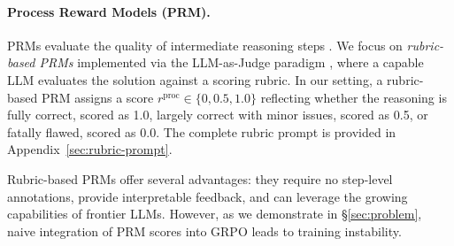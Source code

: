 \paragraph{Process Reward Models (PRM).}
PRMs evaluate the quality of intermediate reasoning steps \citep{zheng2023judgingllmasajudgemtbenchchatbot,lightman2023lets, wang2024math}. We focus on \emph{rubric-based PRMs} implemented via the LLM-as-Judge paradigm \citep{yuan2025miraclesteps,Sheng2026ReinforcingCR,Yang2026}, where a capable LLM evaluates the solution against a scoring rubric. In our setting, a rubric-based PRM assigns a score $r^{\text{proc}} \in \{0, 0.5, 1.0\}$ reflecting whether the reasoning is fully correct, scored as 1.0, largely correct with minor issues, scored as 0.5, or fatally flawed, scored as 0.0. The complete rubric prompt is provided in Appendix~\ref{sec:rubric-prompt}.

Rubric-based PRMs offer several advantages: they require no step-level annotations, provide interpretable feedback, and can leverage the growing capabilities of frontier LLMs. However, as we demonstrate in \S\ref{sec:problem}, naive integration of PRM scores into GRPO leads to training instability.
